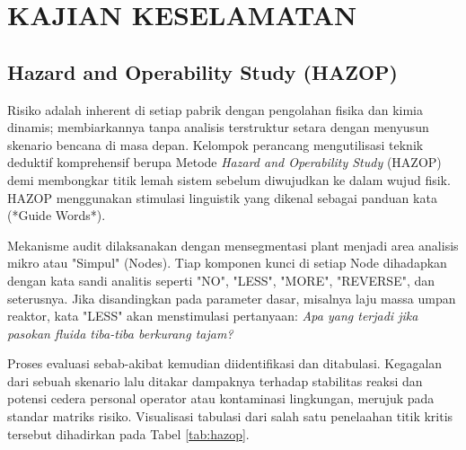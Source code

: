 \documentclass[12pt, a4paper]{report}
\begin{document}
\chapter{KAJIAN KESELAMATAN}

\section{Hazard and Operability Study (HAZOP)}
Risiko adalah inherent di setiap pabrik dengan pengolahan fisika dan kimia dinamis; membiarkannya tanpa analisis terstruktur setara dengan menyusun skenario bencana di masa depan. Kelompok perancang mengutilisasi teknik deduktif komprehensif berupa Metode \textit{Hazard and Operability Study} (HAZOP) demi membongkar titik lemah sistem sebelum diwujudkan ke dalam wujud fisik. HAZOP menggunakan stimulasi linguistik yang dikenal sebagai panduan kata (*Guide Words*).

Mekanisme audit dilaksanakan dengan mensegmentasi plant menjadi area analisis mikro atau "Simpul" (Nodes). Tiap komponen kunci di setiap Node dihadapkan dengan kata sandi analitis seperti "NO", "LESS", "MORE", "REVERSE", dan seterusnya. Jika disandingkan pada parameter dasar, misalnya laju massa umpan reaktor, kata "LESS" akan menstimulasi pertanyaan: \textit{Apa yang terjadi jika pasokan fluida tiba-tiba berkurang tajam?}

Proses evaluasi sebab-akibat kemudian diidentifikasi dan ditabulasi. Kegagalan dari sebuah skenario lalu ditakar dampaknya terhadap stabilitas reaksi dan potensi cedera personal operator atau kontaminasi lingkungan, merujuk pada standar matriks risiko. Visualisasi tabulasi dari salah satu penelaahan titik kritis tersebut dihadirkan pada Tabel \ref{tab:hazop}.

\begin{table}[htbp]
\centering
\caption{Contoh Lembar Kerja HAZOP (Node: Titik Pipa Umpan Utama Reaktor)}
\label{tab:hazop}
\end{table}
\end{document}
